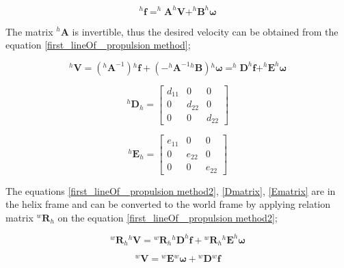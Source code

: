 \documentclass[12pt,a4paper,titlepage]{report}
\begin{document}
\begin{equation}
^{h}\bm{f} = ^{h}\bm{A} ^{h}\bm{V} + ^{h}\bm{B} ^{h}\bm{\omega}
\label{first_lineOf_ propulsion method}
\end{equation}

The matrix $^{h}\bm{A}$ is invertible, thus the desired velocity can be obtained from the
 equation \ref{first_lineOf_ propulsion method};


\begin{equation}
^{h}\bm{V} = (^{h}\bm{A} ^{-1}){^{h}\bm{f}} + (-^{h}\bm{A} ^{-1} {^{h}\bm{B}}){^{h}\bm{\omega}} = 
^{h}\bm{D} ^{h}\bm{f} + ^{h}\bm{E} ^{h}\bm{\omega}
\label{first_lineOf_ propulsion method2}  
\end{equation}


\begin{equation}
 ^{h}\bm{D}_h = \begin{bmatrix}
       d_{11}  & 0 		 & 0           \\[0.3em]
       0		 & d_{22}           & 0\\[0.3em]
       0           	& 0 		& d_{22}
     \end{bmatrix}
\label{Dmatrix}
\end{equation}




\begin{equation}
 ^{h}\bm{E}_h = \begin{bmatrix}
       e_{11}  & 0 		 & 0           \\[0.3em]
       0		 & e_{22}           & 0\\[0.3em]
       0           	& 0 		& e_{22}
     \end{bmatrix}
\label{Ematrix}
\end{equation}

The equations \ref{first_lineOf_ propulsion method2}, \ref{Dmatrix}, \ref{Ematrix} are in the helix frame and 
can be converted to the world frame by applying relation matrix $^{w}\bm{R}_h$ on the equation
\ref{first_lineOf_ propulsion method2};


\begin{equation}
{^{w}\bm{R}_h}{^{h}\bm{V} } = {^{w}\bm{R}_h}{ ^{h}\bm{D} ^{h}\bm{f}} + {^{w}\bm{R}_h}{^{h}\bm{E} ^{h}\bm{\omega}}
\label{first_lineOf_ propulsion method3}  
\end{equation}



\begin{equation}
^{w}\bm{V}  ={^{w}\bm{E}} {^{w}\bm{\omega}} + {^{w}\bm{D}} {^{w}\bm{f}}  
\label{first_lineOf_ propulsion method4}  
\end{equation}
\end{document}
